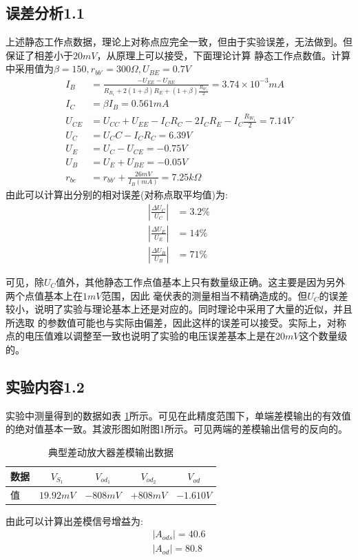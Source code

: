 \documentclass[a4paper,11pt,UTF8]{ctexart}
\begin{document}
\subsection{误差分析1.1}
  上述静态工作点数据，理论上对称点应完全一致，但由于实验误差，无法做到。但保证了相差小于$20mV$，从原理上可以接受，下面理论计算
  静态工作点数值。计算中采用值为$\beta=150,r_{bb'}=300\Omega,U_{BE}=0.7V$
  \begin{equation}
    \begin{aligned}
      I_{B}&=\frac{-U_{EE}-U_{BE}}{R_{B_1}+2(1+\beta)R_E+(1+\beta)\frac{R_{W_1}}{2}}=3.74\times10^{-3}mA\\
      I_{C}&=\beta I_{B}=0.561mA\\
      U_{CE}&=U_{CC}+U_{EE}-I_CR_C-2I_CR_E-I_C\frac{R_{W_1}}{2}=7.14V\\
      U_C&=U_CC-I_CR_C=6.39V\\
      U_E&=U_C-U_{CE}=-0.75V\\
      U_B&=U_E+U_{BE}=-0.05V\\
      r_{be}&=r_{bb'}+\frac{26mV}{I_B(mA)}=7.25k\Omega
    \end{aligned}
  \end{equation}
  由此可以计算出分别的相对误差(对称点取平均值)为:
  \begin{equation}
    \begin{aligned}
      \left |\frac{\Delta U_C}{U_C}\right |&=3.2\%\\
      \left |\frac{\Delta U_E}{U_E}\right |&=14\%\\
      \left |\frac{\Delta U_B}{U_B}\right |&=71\%
    \end{aligned}
  \end{equation}

  可见，除$U_C$值外，其他静态工作点值基本上只有数量级正确。这主要是因为另外两个点值基本上在$1mV$范围，因此
毫伏表的测量相当不精确造成的。但$U_C$的误差较小，说明了实验与理论基本上还是对应的。同时理论中采用了大量的近似，并且所选取
的参数值可能也与实际由偏差，因此这样的误差可以接受。实际上，对称点的电压值难以调整至一致也说明了实验的电压误差基本上是在$20mV$这个数量级的。
\subsection{实验内容1.2}
实验中测量得到的数据如表 \ref{tab:ndTab}所示。可见在此精度范围下，单端差模输出的有效值的绝对值基本一致。其波形图如附图1所示。可见两端的差模输出信号的反向的。
\begin{table}[!h!tbp]
  \caption{典型差动放大器差模输出数据}\label{tab:ndTab}
    \centering
    \begin{tabular}{|l|c|c|c|c|}
    \hline
    数据 &$V_{S_1}$&$V_{od_1}$&$V_{od_2}$&$V_{od}$         \\ \hline
    值   &$19.92mV$&$-808mV$&$+808mV$&$-1.610V$     \\ \hline
  \end{tabular}
  \end{table}
由此可以计算出差模信号增益为:
\begin{equation}
  \begin{aligned}
    \left |A_{ods}\right |=40.6\\
    \left |A_{od}\right |=80.8
  \end{aligned}
\end{equation}
\end{document}
